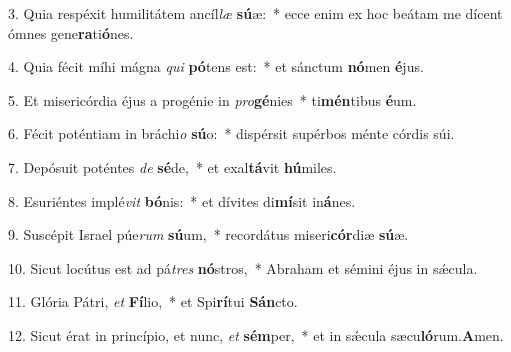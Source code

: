 \item 3. Quia respéxit humilitátem ancíl\textit{læ} \textbf{sú}æ:~* ecce enim ex hoc beátam me dícent ómnes gene\textbf{ra}ti\textbf{ó}nes.

\item 4. Quia fécit míhi mágna \textit{qui} \textbf{pó}tens est:~* et sánctum \textbf{nó}men \textbf{é}jus.

\item 5. Et misericórdia éjus a progénie in \textit{pro}\textbf{gé}nies~* ti\textbf{mén}tibus \textbf{é}um.

\item 6. Fécit poténtiam in bráchi\textit{o} \textbf{sú}o:~* dispérsit supérbos ménte córdis súi.

\item 7. Depósuit poténtes \textit{de} \textbf{sé}de,~* et exal\textbf{tá}vit \textbf{hú}miles.

\item 8. Esuriéntes implé\textit{vit} \textbf{bó}nis:~* et dívites di\textbf{mí}sit in\textbf{á}nes.

\item 9. Suscépit Israel púe\textit{rum} \textbf{sú}um,~* recordátus miseri\textbf{cór}diæ \textbf{sú}æ.

\item 10. Sicut locútus est ad pá\textit{tres} \textbf{nó}stros,~* Abraham et sémini éjus in sǽcula.

\item 11. Glória Pátri, \textit{et} \textbf{Fí}lio,~* et Spi\textbf{rí}tui \textbf{Sán}cto.

\item 12. Sicut érat in princípio, et nunc, \textit{et} \textbf{sém}per,~* et in sǽcula sæcu\textbf{ló}rum.\textbf{A}men.